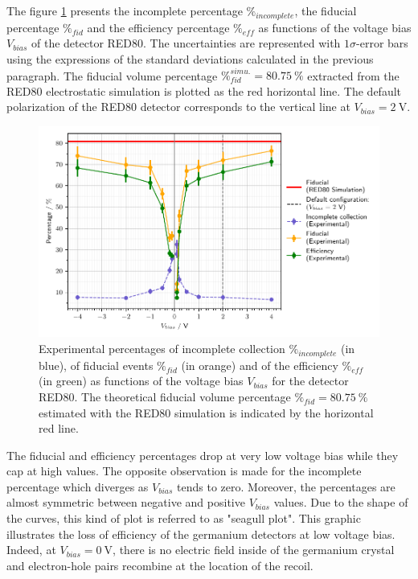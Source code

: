The figure \ref{fig:red80-experimental-fiducial-volume} presents the incomplete percentage $\%_{incomplete}$, the fiducial percentage $\%_{fid}$ and the efficiency percentage $\%_{eff}$ as functions of the voltage bias $V_{bias}$ of the detector RED80. The uncertainties are represented with $1\sigma$-error bars using the expressions of the standard deviations calculated in the previous paragraph. The fiducial volume percentage $\%_{fid}^{simu.}=\SI{80.75}{\percent}$ extracted from the RED80 electrostatic simulation is plotted as the red horizontal line. The default polarization of the RED80 detector corresponds to the vertical line at $V_{bias}=\SI{2}{\volt}$.

\begin{figure}
\centering
\includegraphics[scale=1]{Figures/ElectrodesExperimental/red80_experimental_fiducial_volume.pdf}
\caption{Experimental percentages of incomplete collection $\%_{incomplete}$ (in blue), of fiducial events $\%_{fid}$ (in orange) and of the efficiency $\%_{eff}$ (in green) as functions of the voltage bias $V_{bias}$ for the detector RED80. The theoretical fiducial volume percentage $\%_{fid}=\SI{80.75}{\percent}$ estimated with the RED80 simulation is indicated by the horizontal red line.}
\label{fig:red80-experimental-fiducial-volume}
\end{figure}

The fiducial and efficiency percentages drop at very low voltage bias while they cap at high values. The opposite observation is made for the incomplete percentage which diverges as $V_{bias}$ tends to zero. Moreover, the percentages are almost symmetric between negative and positive $V_{bias}$ values. Due to the shape of the curves, this kind of plot is referred to as "seagull plot". This graphic illustrates the loss of efficiency of the germanium detectors at low voltage bias. Indeed, at $V_{bias}=\SI{0}{\volt}$, there is no electric field inside of the germanium crystal and electron-hole pairs recombine at the location of the recoil. 

